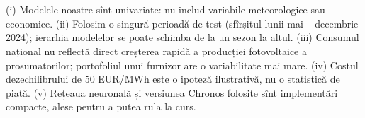 \section{}
%
{(i) Modelele noastre sînt univariate: nu includ variabile meteorologice sau economice.
(ii) Folosim o singură perioadă de test (sfîrșitul lunii mai -- decembrie 2024); ierarhia modelelor se poate schimba de la un sezon la altul.
(iii) Consumul național nu reflectă direct creșterea rapidă a producției fotovoltaice a prosumatorilor; portofoliul unui furnizor are o variabilitate mai mare.
(iv) Costul dezechilibrului de 50 EUR/MWh este o ipoteză ilustrativă, nu o statistică de piață.
(v) Rețeaua neuronală și versiunea Chronos folosite sînt implementări compacte, alese pentru a putea rula la curs.}

\newpage
